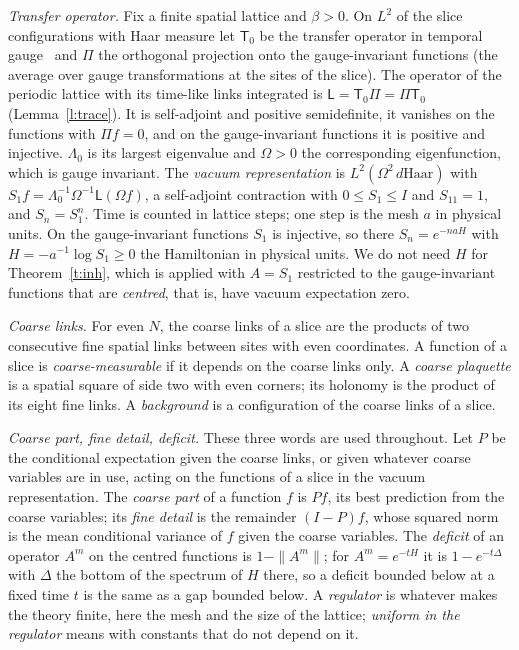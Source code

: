 \emph{Transfer operator.} Fix a finite spatial lattice and $\beta>0$. On $L^2$ of the slice configurations
with Haar measure let $\mathsf T_0$ be the transfer operator in temporal gauge~\cite{Lu77,OS78} and $\Pi$ the
orthogonal projection onto the gauge-invariant functions (the average over gauge transformations at the
sites of the slice). The operator of the periodic lattice with its time-like links integrated is
$\mathsf L=\mathsf T_0\Pi=\Pi\mathsf T_0$ (Lemma~\ref{l:trace}). It is self-adjoint and positive semidefinite, it
vanishes on the functions with $\Pi f=0$, and on the gauge-invariant functions it is positive and injective.
$\Lambda_0$ is its largest eigenvalue and $\Omega>0$ the corresponding eigenfunction, which is gauge invariant.
The \emph{vacuum representation} is $L^2(\Omega^2\,d\mathrm{Haar})$ with
$S_1f=\Lambda_0^{-1}\Omega^{-1}\mathsf L(\Omega f)$, a self-adjoint contraction with $0\le S_1\le I$ and $S_11=1$,
and $S_n=S_1^n$. Time is counted in lattice steps; one step is the mesh $a$ in physical units. On the
gauge-invariant functions $S_1$ is injective, so there $S_n=e^{-naH}$ with $H=-a^{-1}\log S_1\ge0$ the
Hamiltonian in physical units. We do not need $H$ for Theorem~\ref{t:inh}, which is applied with $A=S_1$
restricted to the gauge-invariant functions that are \emph{centred}, that is, have vacuum expectation zero.

\emph{Coarse links.} For even $N$, the coarse links of a slice are the products of two consecutive fine
spatial links between sites with even coordinates. A function of a slice is \emph{coarse-measurable} if it
depends on the coarse links only. A \emph{coarse plaquette} is a spatial square of side two with even corners;
its holonomy is the product of its eight fine links. A \emph{background} is a configuration of the coarse
links of a slice.

\emph{Coarse part, fine detail, deficit.} These three words are used throughout. Let $P$ be the conditional
expectation given the coarse links, or given whatever coarse variables are in use, acting on the functions
of a slice in the vacuum representation. The \emph{coarse part} of a function $f$ is $Pf$, its best
prediction from the coarse variables; its \emph{fine detail} is the remainder $(I-P)f$, whose squared norm
is the mean conditional variance of $f$ given the coarse variables. The \emph{deficit} of an operator $A^m$
on the centred functions is $1-\|A^m\|$; for $A^m=e^{-tH}$ it is $1-e^{-t\Delta}$ with $\Delta$ the bottom
of the spectrum of $H$ there, so a deficit bounded below at a fixed time $t$ is the same as a gap bounded
below. A \emph{regulator} is whatever makes the theory finite, here the mesh and the size of the lattice;
\emph{uniform in the regulator} means with constants that do not depend on it.

